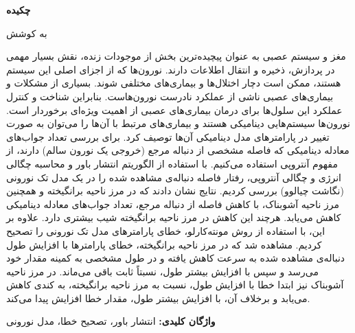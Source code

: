 {
\centering
\textbf{چکیده}

\vspace{\baselineskip}
\textbf{\PersianTitle}

\vspace{2\baselineskip}
به کوشش \\
\textbf{\PersianName} \par
}

\vspace{2\baselineskip}
مغز و سیستم عصبی به عنوان پیچیده‌ترین بخش از موجودات زنده، نقش بسیار مهمی در پردازش، ذخیره و انتقال اطلاعات دارند.
نورون‌ها که از اجزای اصلی این سیستم هستند، ممکن است دچار اختلال‌ها و بیماری‌های مختلفی شوند.
بسیاری از مشکلات و بیماری‌های عصبی ناشی از عملکرد نادرست نورون‌هاست.
بنابراین شناخت و کنترل عملکرد این سلول‌ها برای درمان بیماری‌های عصبی از اهمیت ویژه‌ای برخوردار است.
نورون‌ها سیستم‌هایی دینامیکی هستند و بیماری‌های مرتبط با آن‌ها را می‌توان به صورت تغییر در پارامترهای مدل‌ دینامیکی آن‌ها توصیف کرد.
برای بررسی تعداد جواب‌های معادله دینامیکی که فاصله مشخصی از دنباله مرجع (خروجی یک نورون سالم) دارند، از مفهوم آنتروپی استفاده می‌کنیم.
با استفاده از الگوریتم انتشار باور و محاسبه چگالی انرژی و چگالی آنتروپی، رفتار فاصله دنباله‌ی مشاهده شده را در یک مدل تک نورونی (نگاشت چیالوو) بررسی کردیم.
نتایج نشان دادند که در مرز ناحیه برانگیخته و همچنین مرز ناحیه آشوبناک، با کاهش فاصله از دنباله مرجع، تعداد جواب‌های معادله دینامیکی کاهش می‌یابد.
هرچند این کاهش در مرز ناحیه برانگیخته شیب بیشتری دارد.
علاوه بر این، با استفاده از روش مونته‌کارلو، خطای پارامترهای مدل تک نورونی را تصحیح کردیم.
مشاهده شد که در مرز ناحیه برانگیخته، خطای پارامترها با افزایش طول دنباله‌ی مشاهده شده به سرعت کاهش یافته و در طول مشخصی به کمینه مقدار خود می‌رسد و سپس با افزایش بیشتر طول، نسبتاً ثابت باقی می‌ماند.
در مرز ناحیه آشوبناک نیز ابتدا خطا با افزایش طول، نسبت به مرز ناحیه برانگیخته، به کندی کاهش می‌یابد و برخلاف آن، با افزایش بیشتر طول، مقدار خطا افزایش پیدا می‌کند.

\vspace{\baselineskip}
\textbf{واژگان کلیدی:}
انتشار باور، تصحیح خطا، مدل نورونی
